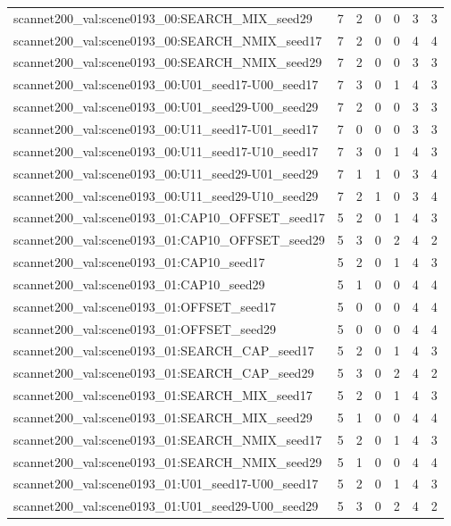 \begin{table}[t]
\begin{tabular}{lrrrrrr}
scannet200\_val:scene0193\_00:SEARCH\_MIX\_seed29 & 7 & 2 & 0 & 0 & 3 & 3 \\
scannet200\_val:scene0193\_00:SEARCH\_NMIX\_seed17 & 7 & 2 & 0 & 0 & 4 & 4 \\
scannet200\_val:scene0193\_00:SEARCH\_NMIX\_seed29 & 7 & 2 & 0 & 0 & 3 & 3 \\
scannet200\_val:scene0193\_00:U01\_seed17-U00\_seed17 & 7 & 3 & 0 & 1 & 4 & 3 \\
scannet200\_val:scene0193\_00:U01\_seed29-U00\_seed29 & 7 & 2 & 0 & 0 & 3 & 3 \\
scannet200\_val:scene0193\_00:U11\_seed17-U01\_seed17 & 7 & 0 & 0 & 0 & 3 & 3 \\
scannet200\_val:scene0193\_00:U11\_seed17-U10\_seed17 & 7 & 3 & 0 & 1 & 4 & 3 \\
scannet200\_val:scene0193\_00:U11\_seed29-U01\_seed29 & 7 & 1 & 1 & 0 & 3 & 4 \\
scannet200\_val:scene0193\_00:U11\_seed29-U10\_seed29 & 7 & 2 & 1 & 0 & 3 & 4 \\
scannet200\_val:scene0193\_01:CAP10\_OFFSET\_seed17 & 5 & 2 & 0 & 1 & 4 & 3 \\
scannet200\_val:scene0193\_01:CAP10\_OFFSET\_seed29 & 5 & 3 & 0 & 2 & 4 & 2 \\
scannet200\_val:scene0193\_01:CAP10\_seed17 & 5 & 2 & 0 & 1 & 4 & 3 \\
scannet200\_val:scene0193\_01:CAP10\_seed29 & 5 & 1 & 0 & 0 & 4 & 4 \\
scannet200\_val:scene0193\_01:OFFSET\_seed17 & 5 & 0 & 0 & 0 & 4 & 4 \\
scannet200\_val:scene0193\_01:OFFSET\_seed29 & 5 & 0 & 0 & 0 & 4 & 4 \\
scannet200\_val:scene0193\_01:SEARCH\_CAP\_seed17 & 5 & 2 & 0 & 1 & 4 & 3 \\
scannet200\_val:scene0193\_01:SEARCH\_CAP\_seed29 & 5 & 3 & 0 & 2 & 4 & 2 \\
scannet200\_val:scene0193\_01:SEARCH\_MIX\_seed17 & 5 & 2 & 0 & 1 & 4 & 3 \\
scannet200\_val:scene0193\_01:SEARCH\_MIX\_seed29 & 5 & 1 & 0 & 0 & 4 & 4 \\
scannet200\_val:scene0193\_01:SEARCH\_NMIX\_seed17 & 5 & 2 & 0 & 1 & 4 & 3 \\
scannet200\_val:scene0193\_01:SEARCH\_NMIX\_seed29 & 5 & 1 & 0 & 0 & 4 & 4 \\
scannet200\_val:scene0193\_01:U01\_seed17-U00\_seed17 & 5 & 2 & 0 & 1 & 4 & 3 \\
scannet200\_val:scene0193\_01:U01\_seed29-U00\_seed29 & 5 & 3 & 0 & 2 & 4 & 2 \\

\end{tabular}
\end{table}
